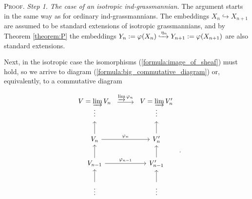 \documentclass[11pt, a4paper]{article}
\begin{document}
\par\textsc{Proof}. 
\emph{Step 1. The case of an isotropic ind-grassmannian.} The argument starts in the same way as for ordinary ind-grassmannians. The embeddings $X_n\hookrightarrow X_{n+1}$ are assumed to be standard extensions of isotropic grassmannians, and by Theorem \ref{theorem:P} %
the embeddings  $Y_{n}:=\varphi(X_n)\xhookrightarrow{\eta_n} Y_{n+1}:=\varphi(X_{n+1})$ are also standard extensions. %

Next, in the isotropic case the isomorphisms (\ref{formula:image_of_sheaf}) must hold, so we arrive to diagram (\ref{formula:big_commutative_diagram}) or, equivalently, to a commutative diagram 

\begin{equation*}
    \begin{tikzcd}
     \begin{array}{c}
           V=\ilm V_n \\
          \vdots
     \end{array} \arrow[r,yshift=2.0ex,"\ilm\vfi_n"] 
& 
     \begin{array}{c}
           V=\ilm V'_n  \\
          \vdots
     \end{array}     \\
V_n \arrow[u] \arrow[r,"\varphi_{n}"]
& V'_{n}  \arrow[u]\\
V_{n-1} \arrow[u] \arrow[r,"\varphi_{n-1}"]
& V'_{n-1}  \arrow[u]\\
\vdots \arrow[u] & \vdots \arrow[u] \\
\end{tikzcd}.
\end{equation*}
\end{document}
